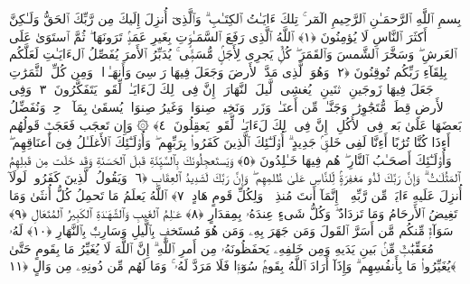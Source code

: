 
  
    
  
    
    

\nopagebreak
  بِسمِ ٱللَّهِ ٱلرَّحمَـٰنِ ٱلرَّحِيمِ
  الٓمٓر ۚ تِلكَ ءَايَـٰتُ ٱلكِتَـٰبِ ۗ وَٱلَّذِىٓ أُنزِلَ إِلَيكَ مِن رَّبِّكَ ٱلحَقُّ وَلَـٰكِنَّ أَكثَرَ ٱلنَّاسِ لَا يُؤمِنُونَ ﴿١﴾
 ٱللَّهُ ٱلَّذِى رَفَعَ ٱلسَّمَـٰوَٟتِ بِغَيرِ عَمَدٍۢ تَرَونَهَا ۖ ثُمَّ ٱستَوَىٰ عَلَى ٱلعَرشِ ۖ وَسَخَّرَ ٱلشَّمسَ وَٱلقَمَرَ ۖ كُلٌّۭ يَجرِى لِأَجَلٍۢ مُّسَمًّۭى ۚ يُدَبِّرُ ٱلأَمرَ يُفَصِّلُ ٱلءَايَـٰتِ لَعَلَّكُم بِلِقَآءِ رَبِّكُم تُوقِنُونَ ﴿٢﴾
 وَهُوَ ٱلَّذِى مَدَّ ٱلأَرضَ وَجَعَلَ فِيهَا رَوَٟسِىَ وَأَنهَـٰرًۭا ۖ وَمِن كُلِّ ٱلثَّمَرَٰتِ جَعَلَ فِيهَا زَوجَينِ ٱثنَينِ ۖ يُغشِى ٱلَّيلَ ٱلنَّهَارَ ۚ إِنَّ فِى ذَٟلِكَ لَءَايَـٰتٍۢ لِّقَومٍۢ يَتَفَكَّرُونَ ﴿٣﴾
 وَفِى ٱلأَرضِ قِطَعٌۭ مُّتَجَٰوِرَٰتٌۭ وَجَنَّـٰتٌۭ مِّن أَعنَـٰبٍۢ وَزَرعٌۭ وَنَخِيلٌۭ صِنوَانٌۭ وَغَيرُ صِنوَانٍۢ يُسقَىٰ بِمَآءٍۢ وَٟحِدٍۢ وَنُفَضِّلُ بَعضَهَا عَلَىٰ بَعضٍۢ فِى ٱلأُكُلِ ۚ إِنَّ فِى ذَٟلِكَ لَءَايَـٰتٍۢ لِّقَومٍۢ يَعقِلُونَ ﴿٤﴾
 ۞ وَإِن تَعجَب فَعَجَبٌۭ قَولُهُم أَءِذَا كُنَّا تُرَٰبًا أَءِنَّا لَفِى خَلقٍۢ جَدِيدٍ ۗ أُو۟لَـٰٓئِكَ ٱلَّذِينَ كَفَرُوا۟ بِرَبِّهِم ۖ وَأُو۟لَـٰٓئِكَ ٱلأَغلَـٰلُ فِىٓ أَعنَاقِهِم ۖ وَأُو۟لَـٰٓئِكَ أَصحَـٰبُ ٱلنَّارِ ۖ هُم فِيهَا خَـٰلِدُونَ ﴿٥﴾
 وَيَستَعجِلُونَكَ بِٱلسَّيِّئَةِ قَبلَ ٱلحَسَنَةِ وَقَد خَلَت مِن قَبلِهِمُ ٱلمَثُلَـٰتُ ۗ وَإِنَّ رَبَّكَ لَذُو مَغفِرَةٍۢ لِّلنَّاسِ عَلَىٰ ظُلمِهِم ۖ وَإِنَّ رَبَّكَ لَشَدِيدُ ٱلعِقَابِ ﴿٦﴾
 وَيَقُولُ ٱلَّذِينَ كَفَرُوا۟ لَولَآ أُنزِلَ عَلَيهِ ءَايَةٌۭ مِّن رَّبِّهِۦٓ ۗ إِنَّمَآ أَنتَ مُنذِرٌۭ ۖ وَلِكُلِّ قَومٍ هَادٍ ﴿٧﴾
 ٱللَّهُ يَعلَمُ مَا تَحمِلُ كُلُّ أُنثَىٰ وَمَا تَغِيضُ ٱلأَرحَامُ وَمَا تَزدَادُ ۖ وَكُلُّ شَىءٍ عِندَهُۥ بِمِقدَارٍ ﴿٨﴾
 عَـٰلِمُ ٱلغَيبِ وَٱلشَّهَـٰدَةِ ٱلكَبِيرُ ٱلمُتَعَالِ ﴿٩﴾
 سَوَآءٌۭ مِّنكُم مَّن أَسَرَّ ٱلقَولَ وَمَن جَهَرَ بِهِۦ وَمَن هُوَ مُستَخفٍۭ بِٱلَّيلِ وَسَارِبٌۢ بِٱلنَّهَارِ ﴿١٠﴾
 لَهُۥ مُعَقِّبَٰتٌۭ مِّنۢ بَينِ يَدَيهِ وَمِن خَلفِهِۦ يَحفَظُونَهُۥ مِن أَمرِ ٱللَّهِ ۗ إِنَّ ٱللَّهَ لَا يُغَيِّرُ مَا بِقَومٍ حَتَّىٰ يُغَيِّرُوا۟ مَا بِأَنفُسِهِم ۗ وَإِذَآ أَرَادَ ٱللَّهُ بِقَومٍۢ سُوٓءًۭا فَلَا مَرَدَّ لَهُۥ ۚ وَمَا لَهُم مِّن دُونِهِۦ مِن وَالٍ ﴿١١﴾
